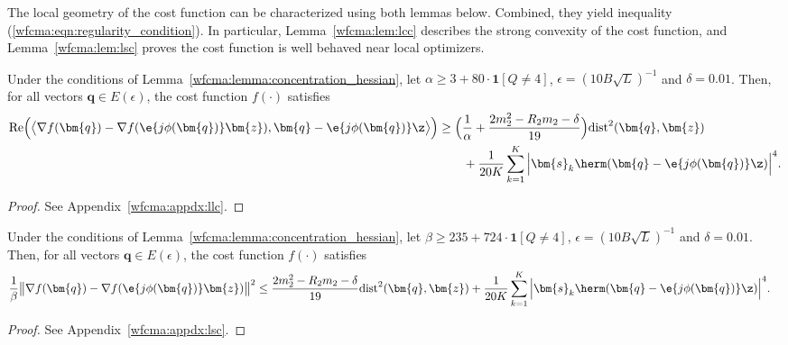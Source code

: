 The local geometry of the cost function can be characterized using both lemmas below. Combined, they yield inequality (\ref{wfcma:eqn:regularity_condition}). In particular, Lemma~\ref{wfcma:lem:lcc} describes the strong convexity of the cost function, and Lemma~\ref{wfcma:lem:lsc} proves the cost function is well behaved near local optimizers.

\begin{lem} \label{wfcma:lem:lcc}
Under the conditions of Lemma~\ref{wfcma:lemma:concentration_hessian}, let $\alpha\geq 3 + 80\cdot\bm{1}[Q\neq4]$, $\epsilon=(10 B\sqrt{L})^{-1}$  and $\delta=0.01$. Then, for all vectors $\bm{q}\in E(\epsilon)$, the cost function $f(\cdot)$ satisfies
\begin{align}
	\mathrm{Re}\Big( \big\langle\nabla f(\bm{q})-\nabla f(\e{j\phi(\bm{q})}\bm{z}), \bm{q} - \e{j\phi(\bm{q})}\z\big\rangle\Big) 
	&\geq\Big(\frac{1}{\alpha}+\frac{2  m_2^2-R_2  m_2-\delta}{19}\Big)\mathrm{dist}^2(\bm{q},\bm{z}) 
	\nonumber\\&\qquad
	+ \frac{1}{20 K}\sum_{k=1}^K \Big|\bm{s}_k\herm(\bm{q} - \e{j\phi(\bm{q})}\z)\Big|^4.\label{wfcma:eqn:llc}
\end{align} 
\end{lem}
\begin{proof}
See Appendix~\ref{wfcma:appdx:llc}.
\end{proof} 

\begin{lem} \label{wfcma:lem:lsc} 
Under the conditions of Lemma~\ref{wfcma:lemma:concentration_hessian}, let $\beta\geq235 + 724\cdot\bm{1}[Q\neq4]$, $\epsilon=(10 B\sqrt{L})^{-1}$ and $\delta=0.01$. Then, for all vectors $\bm{q}\in E(\epsilon)$, the cost function $f(\cdot)$ satisfies
\begin{align}
	\frac{1}{\beta}\big\|\nabla f(\bm{q})-\nabla f(\e{j\phi(\bm{q})}\bm{z})\big\|^2 
	&\leq \frac{2  m_2^2-R_2  m_2-\delta}{19}\mathrm{dist}^2(\bm{q},\bm{z})
	+ \frac{1}{20 K}\sum_{k=1}^K \Big|\bm{s}_k\herm(\bm{q} - \e{j\phi(\bm{q})}\z)\Big|^4.\label{wfcma:eqn:lsc}
\end{align}
\end{lem}
\begin{proof}
See Appendix~\ref{wfcma:appdx:lsc}.
\end{proof} 

